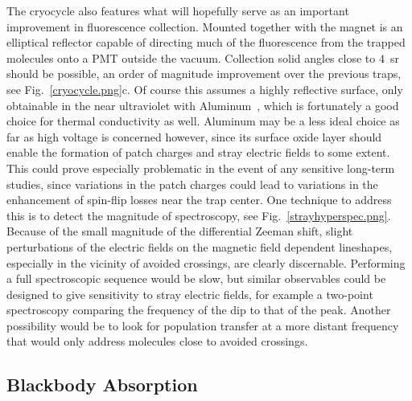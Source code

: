 The cryocycle also features what will hopefully serve as an important improvement in fluorescence collection.
Mounted together with the magnet is an elliptical reflector capable of directing much of the fluorescence from the trapped molecules onto a PMT outside the vacuum.
Collection solid angles close to $4$~sr should be possible, an order of magnitude improvement over the previous traps, see Fig.~\ref{cryocycle.png}c.
Of course this assumes a highly reflective surface, only obtainable in the near ultraviolet with Aluminum~\cite{rumble2017crc}, which is fortunately a good choice for thermal conductivity as well.
Aluminum may be a less ideal choice as far as high voltage is concerned however, since its surface oxide layer should enable the formation of patch charges and stray electric fields to some extent.
This could prove especially problematic in the event of any sensitive long-term studies, since variations in the patch charges could lead to variations in the enhancement of spin-flip losses near the trap center.
One technique to address this is to detect the magnitude of spectroscopy, see Fig.~\ref{strayhyperspec.png}.
Because of the small magnitude of the differential Zeeman shift, slight perturbations of the electric fields on the magnetic field dependent lineshapes, especially in the vicinity of avoided crossings, are clearly discernable.
Performing a full spectroscopic sequence would be slow, but similar observables could be designed to give sensitivity to stray electric fields, for example a two-point spectroscopy comparing the frequency of the dip to that of the peak.
Another possibility would be to look for population transfer at a more distant frequency that would only address molecules close to avoided crossings.


\subsection{Blackbody Absorption}


